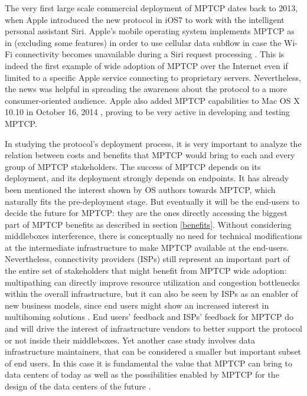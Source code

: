 The very first large scale commercial deployment of MPTCP dates back to 2013, when Apple introduced the new protocol in iOS7 to work with the intelligent personal assistant Siri. Apple's mobile operating system implements MPTCP as in  (excluding some features) in order to use cellular data subflow in case the Wi-Fi connectivity becomes unavailable during a Siri request processing \cite{apple}. This is indeed the first example of wide adoption of MPTCP over the Internet even if limited to a specific Apple service connecting to proprietary servers. Nevertheless, the news was helpful in spreading the awareness about the protocol to a more consumer-oriented audience. Apple also added MPTCP capabilities to Mac OS X 10.10 in October 16, 2014 \cite{osx}, proving to be very active in developing and testing MPTCP.

In studying the protocol's deployment process, it is very important to analyze the relation between costs and benefits that MPTCP would bring to each and every group of MPTCP stakeholders.
The success of MPTCP depends on its deployment, and its deployment strongly depends on endpoints. It has already been mentioned the interest shown by OS authors towards MPTCP, which naturally fits the pre-deployment stage. But eventually it will be the end-users to decide the future for MPTCP: they are the ones directly accessing the biggest part of MPTCP benefits as described in section \ref{benefits}. Without considering middleboxes interference, there is conceptually no need for technical modifications at the intermediate infrastructure to make MPTCP available at the end-users. Nevertheless, connectivity providers (ISPs) still represent an important part of the entire set of stakeholders that might benefit from MPTCP wide adoption: multipathing can directly improve resource utilization and congestion bottlenecks within the overall infrastructure, but it can also be seen by ISPs as an enabler of new business models, since end users might show an increased interest in multihoming solutions \cite{DBLP:conf/fia/2010}. End users' feedback and ISPs' feedback for MPTCP do and will drive the interest of infrastructure vendors to better support the protocol or not inside their middleboxes. 
Yet another case study involves data infrastructure maintainers, that can be considered a smaller but important subset of end users. In this case it is fundamental the value that MPTCP can bring to data centers of today as well as the possibilities enabled by MPTCP for the design of the data centers of the future \cite{Raiciu:2011:IDP:2043164.2018467}.

